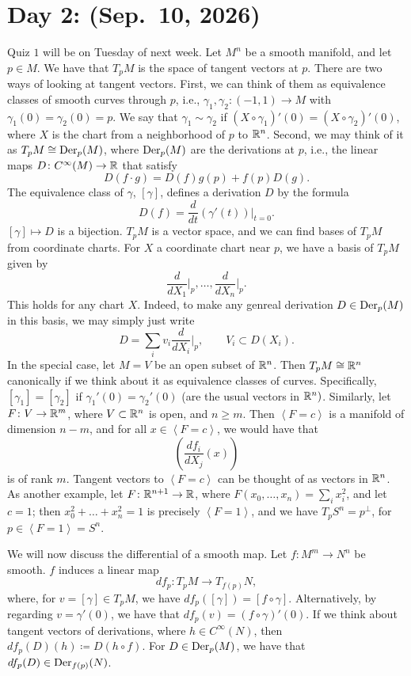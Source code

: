 \section{Day 2: (Sep.\ 10, 2026)}
Quiz $1$ will be on Tuesday of next week. Let $M^n$ be a smooth manifold, and let $p \in M$. We have that $T_p M$ is the space of tangent vectors at $p$. There are two ways of looking at tangent vectors. First, we can think of them as equivalence classes of smooth curves through $p$, i.e., $\gamma_1, \gamma_2 \colon (-1, 1) \to M$ with $\gamma_1(0) = \gamma_2(0) = p$. We say that $\gamma_1 \sim \gamma_2$ if $(X \circ \gamma_1)'(0) = (X \circ \gamma_2)'(0)$, where $X$ is the chart from a neighborhood of $p$ to $\mathbb R^n$. Second, we may think of it as $T_p M \cong \operatorname{Der}_p(M)$, where $\operatorname{Der}_p(M)$ are the derivations at $p$, i.e., the linear maps $D \colon C^\infty(M) \to \mathbb R$ that satisfy
\[ D(f \cdot g) = D(f) g(p) + f(p) D(g). \]
The equivalence class of $\gamma$, $[\gamma]$, defines a derivation $D$ by the formula
\[ D(f) = \frac{d}{dt} (\gamma'(t)) \biggr\rvert_{t=0}. \]
$[\gamma] \mapsto D$ is a bijection. $T_p M$ is a vector space, and we can find bases of $T_p M$ from coordinate charts. For $X$ a coordinate chart near $p$, we have a basis of $T_p M$ given by
\[ \frac{d}{d X_1} \biggr\rvert_p, \dots, \frac{d}{d X_n} \biggr\rvert_p. \]
This holds for any chart $X$. Indeed, to make any genreal derivation $D \in \operatorname{Der}_p(M)$ in this basis, we may simply just write
\[ D = \sum_i v_i \frac{d}{dX_i} \biggr\rvert_p, \qquad V_i \subset D(X_i). \]
In the special case, let $M = V$ be an open subset of $\mathbb R^n$. Then $T_p M \cong \mathbb R^n$ canonically if we think about it as equivalence classes of curves. Specifically, $[\gamma_1] = [\gamma_2]$ if $\gamma_1'(0) = \gamma_2'(0)$ (are the usual vectors in $\mathbb R^n)$. Similarly, let $F \colon V \to \mathbb R^m$, where $V \subset \mathbb R^n$ is open, and $n \geq m$. Then $\left<F = c\right>$ is a manifold of dimension $n-m$, and for all $x \in \left<F = c\right>$, we would have that
\[ \left(\frac{df_i}{dX_j}(x)\right) \]
is of rank $m$. Tangent vectors to $\left<F = c\right>$ can be thought of as vectors in $\mathbb R^n$. As another example, let $F \colon \mathbb R^{n+1} \to \mathbb R$, where $F(x_0, \dots, x_n) = \sum_i x_i^2$, and let $c = 1$; then $x_0^2 + \dots + x_n^2 = 1$ is precisely $\left<F = 1\right>$, and we have $T_p S^n = p^\perp$, for $p \in \left<F = 1\right> = S^n$.

We will now discuss the differential of a smooth map. Let $f \colon M^m \to N^n$ be smooth. $f$ induces a linear map
\[ df_p \colon T_p M \to T_{f(p)} N, \]
where, for $v = [\gamma] \in T_p M$, we have $df_p([\gamma]) = [f \circ \gamma]$. Alternatively, by regarding $v = \gamma'(0)$, we have that $df_p(v) = (f \circ \gamma)'(0)$. If we think about tangent vectors of derivations, where $h \in C^\infty(N)$, then $d f_p (D)(h) \coloneq D(h \circ f)$. For $D \in \operatorname{Der}_p(M)$, we have that $df_p(D) \in \operatorname{Der}_{f(p)}(N)$.


